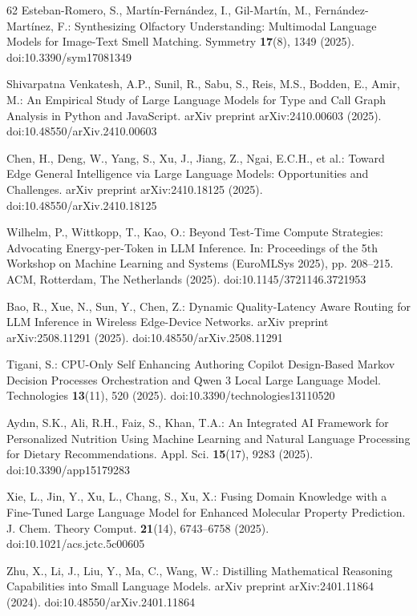 \begin{thebibliography}{62}
Esteban-Romero, S., Martín-Fernández, I., Gil-Martín, M., Fernández-Martínez, F.: Synthesizing Olfactory Understanding: Multimodal Language Models for Image-Text Smell Matching. Symmetry \textbf{17}(8), 1349 (2025). doi:10.3390/sym17081349

Shivarpatna Venkatesh, A.P., Sunil, R., Sabu, S., Reis, M.S., Bodden, E., Amir, M.: An Empirical Study of Large Language Models for Type and Call Graph Analysis in Python and JavaScript. arXiv preprint arXiv:2410.00603 (2025). doi:10.48550/arXiv.2410.00603

Chen, H., Deng, W., Yang, S., Xu, J., Jiang, Z., Ngai, E.C.H., et al.: Toward Edge General Intelligence via Large Language Models: Opportunities and Challenges. arXiv preprint arXiv:2410.18125 (2025). doi:10.48550/arXiv.2410.18125

Wilhelm, P., Wittkopp, T., Kao, O.: Beyond Test-Time Compute Strategies: Advocating Energy-per-Token in LLM Inference. In: Proceedings of the 5th Workshop on Machine Learning and Systems (EuroMLSys 2025), pp. 208--215. ACM, Rotterdam, The Netherlands (2025). doi:10.1145/3721146.3721953

Bao, R., Xue, N., Sun, Y., Chen, Z.: Dynamic Quality-Latency Aware Routing for LLM Inference in Wireless Edge-Device Networks. arXiv preprint arXiv:2508.11291 (2025). doi:10.48550/arXiv.2508.11291

Tigani, S.: CPU-Only Self Enhancing Authoring Copilot Design-Based Markov Decision Processes Orchestration and Qwen 3 Local Large Language Model. Technologies \textbf{13}(11), 520 (2025). doi:10.3390/technologies13110520

Aydın, S.K., Ali, R.H., Faiz, S., Khan, T.A.: An Integrated AI Framework for Personalized Nutrition Using Machine Learning and Natural Language Processing for Dietary Recommendations. Appl. Sci. \textbf{15}(17), 9283 (2025). doi:10.3390/app15179283

Xie, L., Jin, Y., Xu, L., Chang, S., Xu, X.: Fusing Domain Knowledge with a Fine-Tuned Large Language Model for Enhanced Molecular Property Prediction. J. Chem. Theory Comput. \textbf{21}(14), 6743--6758 (2025). doi:10.1021/acs.jctc.5c00605

Zhu, X., Li, J., Liu, Y., Ma, C., Wang, W.: Distilling Mathematical Reasoning Capabilities into Small Language Models. arXiv preprint arXiv:2401.11864 (2024). doi:10.48550/arXiv.2401.11864


\end{thebibliography}
